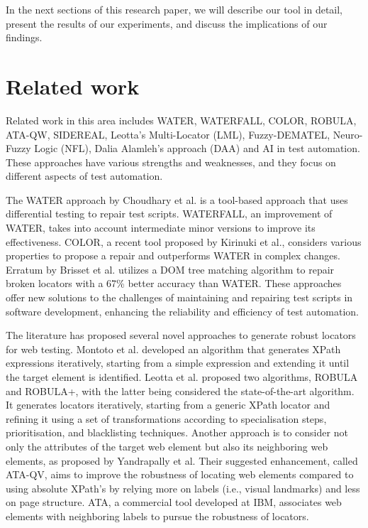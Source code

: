 \documentclass{article}
\begin{document}
In the next sections of this research paper, we will describe our tool in detail, present the results of our experiments, and discuss the implications of our findings.

\maketitle

\section{Related work}

Related work in this area includes WATER, WATERFALL, COLOR, ROBULA, ATA-QW, SIDEREAL, Leotta's Multi-Locator (LML), Fuzzy-DEMATEL, Neuro-Fuzzy Logic (NFL), Dalia Alamleh's approach (DAA) and AI in test automation. These approaches have various strengths and weaknesses, and they focus on different aspects of test automation.

The WATER approach by Choudhary et al. is a tool-based approach that uses differential testing to repair test scripts. WATERFALL, an improvement of WATER, takes into account intermediate minor versions to improve its effectiveness. COLOR, a recent tool proposed by Kirinuki et al., considers various properties to propose a repair and outperforms WATER in complex changes. Erratum by Brisset et al. utilizes a DOM tree matching algorithm to repair broken locators with a 67\% better accuracy than WATER. These approaches offer new solutions to the challenges of maintaining and repairing test scripts in software development, enhancing the reliability and efficiency of test automation.

The literature has proposed several novel approaches to generate robust locators for web testing. Montoto et al. developed an algorithm that generates XPath expressions iteratively, starting from a simple expression and extending it until the target element is identified. Leotta et al. proposed two algorithms, ROBULA and ROBULA+, with the latter being considered the state-of-the-art algorithm. It generates locators iteratively, starting from a generic XPath locator and refining it using a set of transformations according to specialisation steps, prioritisation, and blacklisting techniques. Another approach is to consider not only the attributes of the target web element but also its neighboring web elements, as proposed by Yandrapally et al. Their suggested enhancement, called ATA-QV, aims to improve the robustness of locating web elements compared to using absolute XPath's by relying more on labels (i.e., visual landmarks) and less on page structure. ATA, a commercial tool developed at IBM, associates web elements with neighboring labels to pursue the robustness of locators.
\end{document}
